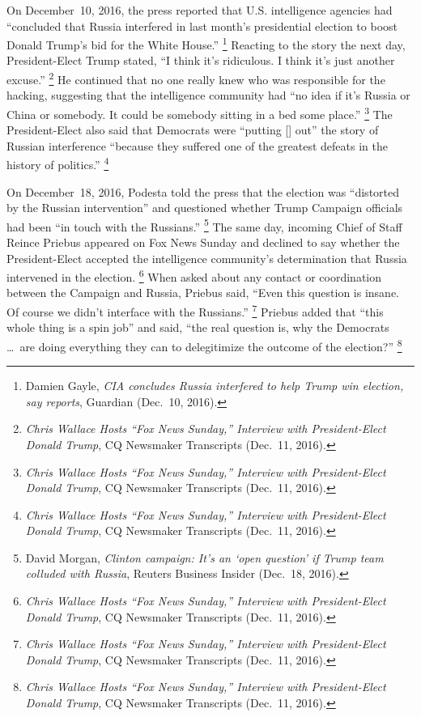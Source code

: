 On December~10, 2016, the press reported that U.S. intelligence agencies had ``concluded that Russia interfered in last month's presidential election to boost Donald Trump's bid for the White House.''%
\footnote{Damien Gayle, \textit{CIA concludes Russia interfered to help Trump win election, say reports}, Guardian (Dec.~10, 2016).}
Reacting to the story the next day, President-Elect Trump stated, ``I think it's ridiculous.
I think it's just another excuse.''%
\footnote{\textit{Chris Wallace Hosts ``Fox News Sunday,'' Interview with President-Elect Donald Trump}, CQ Newsmaker Transcripts (Dec.~11, 2016).}
He continued that no one really knew who was responsible for the hacking, suggesting that the intelligence community had ``no idea if it's Russia or China or somebody.
It could be somebody sitting in a bed some place.''%
\footnote{\textit{Chris Wallace Hosts ``Fox News Sunday,'' Interview with President-Elect Donald Trump}, CQ Newsmaker Transcripts (Dec.~11, 2016).}
The President-Elect also said that Democrats were ``putting [] out'' the story of Russian interference ``because they suffered one of the greatest defeats in the history of politics.''%
\footnote{\textit{Chris Wallace Hosts ``Fox News Sunday,'' Interview with President-Elect Donald Trump}, CQ Newsmaker Transcripts (Dec.~11, 2016).}

On December~18, 2016, Podesta told the press that the election was ``distorted by the Russian intervention'' and questioned whether Trump Campaign officials had been ``in touch with the Russians.''%
\footnote{David Morgan, \textit{Clinton campaign: It's an `open question' if Trump team colluded with Russia}, Reuters Business Insider (Dec.~18, 2016).}
The same day, incoming Chief of Staff Reince Priebus appeared on Fox News Sunday and declined to say whether the President-Elect accepted the intelligence community's determination that Russia intervened in the election.%
\footnote{\textit{Chris Wallace Hosts ``Fox News Sunday,'' Interview with President-Elect Donald Trump}, CQ Newsmaker Transcripts (Dec.~11, 2016).}
When asked about any contact or coordination between the Campaign and Russia, Priebus said, ``Even this question is insane.
Of course we didn't interface with the Russians.''%
\footnote{\textit{Chris Wallace Hosts ``Fox News Sunday,'' Interview with President-Elect Donald Trump}, CQ Newsmaker Transcripts (Dec.~11, 2016).}
Priebus added that ``this whole thing is a spin job'' and said, ``the real question is, why the Democrats \dots\ are doing everything they can to delegitimize the outcome of the election?''%
\footnote{\textit{Chris Wallace Hosts ``Fox News Sunday,'' Interview with President-Elect Donald Trump}, CQ Newsmaker Transcripts (Dec.~11, 2016).}


